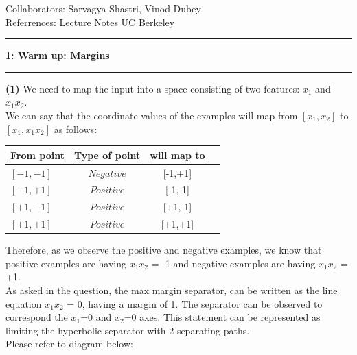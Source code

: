 \documentclass[11pt]{article}
\newcommand\question[2]{\vspace{.25in}\hrule\textbf{#1: #2}\vspace{.5em}\hrule\vspace{.10in}}
\renewcommand\part[1]{\vspace{.10in}\textbf{(#1)}}
\begin{document}
\raggedright
\newcommand\NAME{Aishwarya Asesh}  %
\newcommand\UID{u1063384}     %
\newcommand\HWNUM{5}              %


Collaborators: Sarvagya Shastri, Vinod Dubey\\
Referrences: Lecture Notes UC Berkeley\\

\question{1}{Warm up: Margins}
\part{1} We need to map the input into a space consisting of two features: $x_1$ and $x_{1}x_{2}$. \\
We can say that the coordinate values of the examples will map from $[x_{1},x_{2}]$ to $[ x_{1},x_{1}x_{2}]$ as follows:\\
\bgroup 
\def\arraystretch{1.5}
\begin{tabular}{|l|c|c|c|} \hline 
{\bf \underline {From point}} & {\bf \underline {Type of point}} & {\bf \underline {will map to}} \\ \hline
$[-1,-1]$ & $Negative$ & [-1,+1]\\ \hline
$[-1,+1]$ & $Positive$ & [-1,-1]\\ \hline
$[+1,-1]$ & $Positive$ & [+1,-1]\\ \hline
$[+1,+1]$ & $Positive$ & [+1,+1]\\ \hline
\end{tabular}
\egroup

Therefore, as we observe the positive and negative examples, we know that positive examples are having $x_{1}x_{2}$ = -1 and negative examples are having $x_{1}x_{2}$ = +1.\\
As asked in the question, the max margin separator, can be written as the line equation $x_{1}x_{2}$ = 0, having a margin of 1. The separator can be observed to correspond the $x_1$=0 and $x_2$=0 axes. This statement can be represented as limiting the hyperbolic separator with 2 separating paths.\\
Please refer to diagram below:\\
\end{document}

